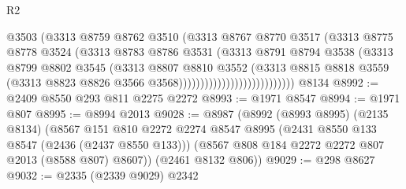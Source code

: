 \begin{lexlean}{R2}
\begin{coremodule}
                                        @3503
                                        (@3313
                                          @8759
                                          @8762
                                          @3510
                                          (@3313
                                            @8767
                                            @8770
                                            @3517
                                            (@3313
                                              @8775
                                              @8778
                                              @3524
                                              (@3313
                                                @8783
                                                @8786
                                                @3531
                                                (@3313
                                                  @8791
                                                  @8794
                                                  @3538
                                                  (@3313
                                                    @8799
                                                    @8802
                                                    @3545
                                                    (@3313
                                                      @8807
                                                      @8810
                                                      @3552
                                                      (@3313
                                                        @8815
                                                        @8818
                                                        @3559
                                                        (@3313
                                                          @8823
                                                          @8826
                                                          @3566
                                                          @3568)))))))))))))))))))))))))))
    @8134
@8992 := @2409 @8550 @293 @811 @2275 @2272
@8993 := @1971 @8547
@8994 := @1971 @807
@8995 := @8994 @2013
@9028 := @8987
    (@8992
      (@8993 @8995)
      (@2135 @8134)
      (@8567
        @151
        @810
        @2272
        @2274
        @8547
        @8995
        (@2431 @8550 @133 @8547 (@2436 (@2437 @8550 @133)))
        (@8567 @808 @184 @2272 @2272 @807 @2013 (@8588 @807) @8607))
      (@2461 @8132 @806))
@9029 := @298 @8627
@9032 := @2335 (@2339 @9029) @2342

\end{coremodule}
\end{lexlean}
